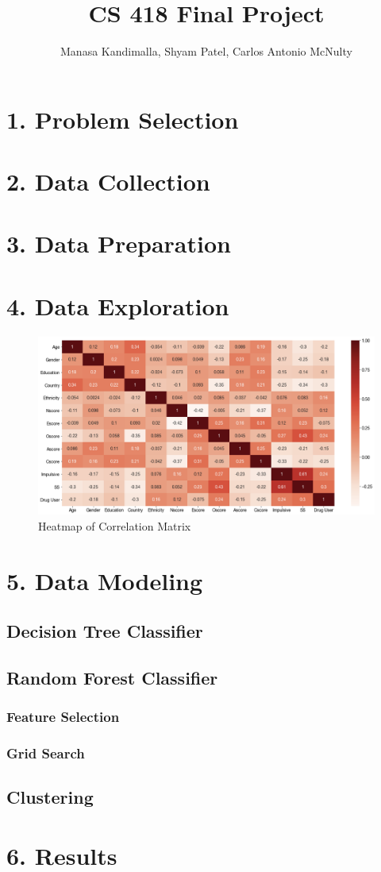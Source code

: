 \documentclass[10pt]{article}
\title{CS 418 Final Project}
\author {Manasa Kandimalla, Shyam Patel, Carlos Antonio McNulty}
\begin{document}
\maketitle

\section*{1. Problem Selection}

\section*{2. Data Collection}

\section*{3. Data Preparation}

\section*{4. Data Exploration}


\begin{figure}[h]
\caption{Heatmap of Correlation Matrix}
\centering
\includegraphics[scale=0.25]{heatmap.png}
\end{figure}


\section*{5. Data Modeling}

\subsection*{Decision Tree Classifier}


\subsection*{Random Forest Classifier}

\subsubsection*{Feature Selection}

\subsubsection*{Grid Search}

\subsection*{Clustering}

\section*{6. Results}
\end{document}
